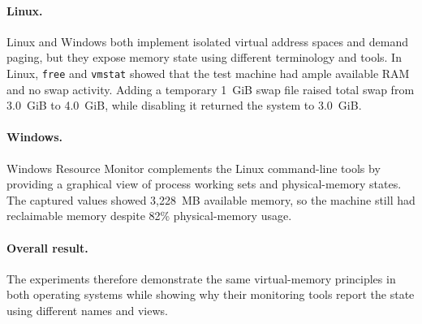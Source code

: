 
\paragraph{Linux.}
Linux and Windows both implement isolated virtual address spaces and demand
paging, but they expose memory state using different terminology and tools. In
Linux, \texttt{free} and \texttt{vmstat} showed that the test machine had ample
available RAM and no swap activity. Adding a temporary 1~GiB swap file raised
total swap from 3.0~GiB to 4.0~GiB, while disabling it returned the system to
3.0~GiB.

\paragraph{Windows.}
Windows Resource Monitor complements the Linux command-line tools by providing
a graphical view of process working sets and physical-memory states. The
captured values showed 3,228~MB available memory, so the machine still had
reclaimable memory despite 82\% physical-memory usage.

\paragraph{Overall result.}
The experiments therefore demonstrate the same virtual-memory principles in
both operating systems while showing why their monitoring tools report the
state using different names and views.
